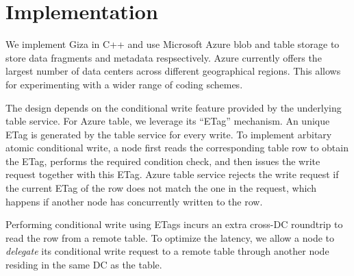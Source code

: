 \section{Implementation}
\label{sec:impl}

We implement Giza in C++ and use Microsoft Azure blob and table storage to store data fragments and metadata respsectively.
Azure currently offers the largest number of data centers across different geographical regions. This allows for experimenting 
with a wider range of coding schemes.


The \name design depends on the conditional write feature provided by the underlying 
table service.
For Azure table, we leverage its ``ETag'' mechanism. An unique ETag 
is generated by the table service for every write.  To implement arbitary atomic
conditional write, a \name node first reads the corresponding table row to
obtain the ETag, performs the required condition check, and then issues the
write request together with this ETag.  Azure table service rejects the
write request if the current ETag of the row does not match the one in the
request, which happens if another \name node has concurrently written to the row.  

Performing conditional write using ETags 
incurs an extra cross-DC roundtrip to read the row from a remote table.
To optimize the latency, we allow a \name node to \emph{delegate} its 
conditional write request to a remote table through another node 
residing in the same DC as the table.


